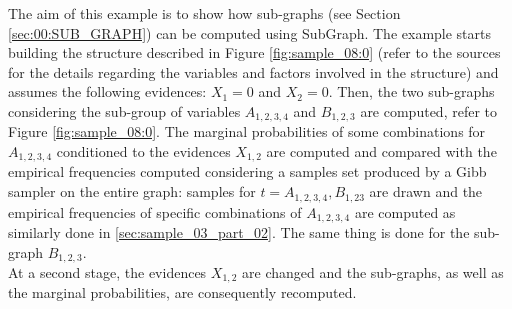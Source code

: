The aim of this example is to show how sub-graphs (see Section \ref{sec:00:SUB_GRAPH}) can be computed using SubGraph.
The example starts building the structure described in Figure \ref{fig:sample_08:0} (refer to the sources for the details regarding the variables and factors involved in the structure) and assumes the following evidences: $X_1 = 0$ and $X_2 = 0$.
Then, the two sub-graphs considering the sub-group of variables $A_{1,2,3,4}$ and $B_{1,2,3}$ are computed, refer to Figure \ref{fig:sample_08:0}. The marginal probabilities of some combinations for $A_{1,2,3,4}$ conditioned to the evidences $X_{1,2}$ are computed and compared with the empirical frequencies computed considering a samples set produced by a Gibb sampler on the entire graph: samples for $t = A_{1,2,3,4}, B_{1,23}$ are drawn and the empirical frequencies of specific combinations of $A_{1,2,3,4}$ are computed as similarly done in \ref{sec:sample_03_part_02}. The same thing is done for the sub-graph $B_{1,2,3}$.
\\
At a second stage, the evidences $X_{1,2}$ are changed and the sub-graphs, as well as the marginal probabilities, are consequently recomputed.